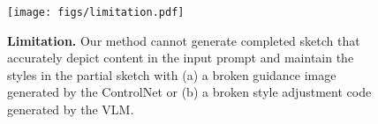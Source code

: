\begin{figure}[!t]
  \centering
  \texttt{[image: figs/limitation.pdf]}
  \caption{
\textbf{Limitation.} 
Our method cannot generate completed sketch that accurately depict content in the input prompt and maintain the styles in the partial sketch with (a) a broken guidance image generated by the ControlNet or (b) a broken style adjustment code generated by the VLM.
}
  \label{fig:limitation}
\end{figure}
